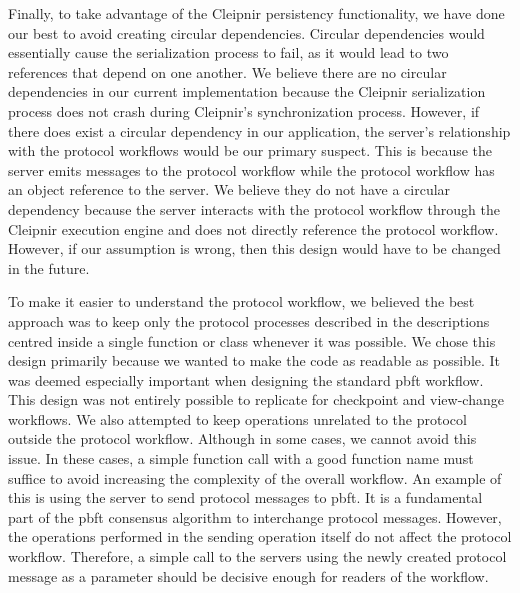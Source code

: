 Finally, to take advantage of the Cleipnir persistency functionality, we have done our best to avoid creating circular dependencies. Circular dependencies would essentially cause the serialization process to fail, as it would lead to two references that depend on one another. We believe there are no circular dependencies in our current implementation because the Cleipnir serialization process does not crash during Cleipnir’s synchronization process. However, if there does exist a circular dependency in our application, the server’s relationship with the protocol workflows would be our primary suspect. This is because the server emits messages to the protocol workflow while the protocol workflow has an object reference to the server. We believe they do not have a circular dependency because the server interacts with the protocol workflow through the Cleipnir execution engine and does not directly reference the protocol workflow. However, if our assumption is wrong, then this design would have to be changed in the future.

To make it easier to understand the protocol workflow, we believed the best approach was to keep only the protocol processes described in the descriptions centred inside a single function or class whenever it was possible. We chose this design primarily because we wanted to make the code as readable as possible. It was deemed especially important when designing the standard \ac{pbft} workflow. This design was not entirely possible to replicate for checkpoint and view-change workflows. We also attempted to keep operations unrelated to the protocol outside the protocol workflow. Although in some cases, we cannot avoid this issue. In these cases, a simple function call with a good function name must suffice to avoid increasing the complexity of the overall workflow.
An example of this is using the server to send protocol messages to \ac{pbft}. It is a fundamental part of the \ac{pbft} consensus algorithm to interchange protocol messages. However, the operations performed in the sending operation itself do not affect the protocol workflow. Therefore, a simple call to the servers  using the newly created protocol message as a parameter should be decisive enough for readers of the workflow. 

